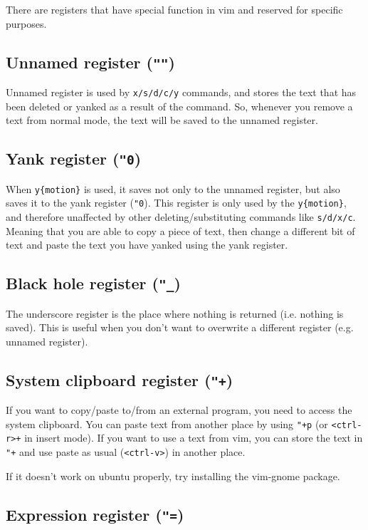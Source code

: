 There are registers that have special function in vim and reserved for specific purposes.

\subsection{Unnamed register (\texttt{""})}

Unnamed register is used by \verb|x/s/d/c/y| commands, and stores the text that has been deleted or yanked as a result of the command.
So, whenever you remove a text from normal mode, the text will be saved to the unnamed register.

\subsection{Yank register (\texttt{"0})}

When \verb|y{motion}| is used, it saves not only to the unnamed register, but also saves it to the yank register (\verb|"0|).
This register is only used by the \verb|y{motion}|, and therefore unaffected by other deleting/substituting commands like \verb|s/d/x/c|.
Meaning that you are able to copy a piece of text, then change a different bit of text and paste the text you have yanked using the yank register.

\subsection{Black hole register (\texttt{"\_})}

The underscore register is the place where nothing is returned (i.e. nothing is saved).
This is useful when you don't want to overwrite a different register (e.g. unnamed register).

\subsection{System clipboard register (\texttt{"+})}

If you want to copy/paste to/from an external program, you need to access the system clipboard.
You can paste text from another place by using \verb|"+p| (or \verb|<ctrl-r>+| in insert mode).
If you want to use a text from vim, you can store the text in \verb|"+| and use paste as usual (\verb|<ctrl-v>|) in another place.

If it doesn't work on ubuntu properly, try installing the vim-gnome package.

\subsection{Expression register (\texttt{"=})}

